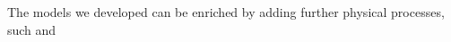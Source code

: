 \documentclass[fleqn,usenatbib]{mnras}
\begin{document}
The models we developed can be enriched by adding further physical processes, such  and 





 


\label{lastpage}
\end{document}
